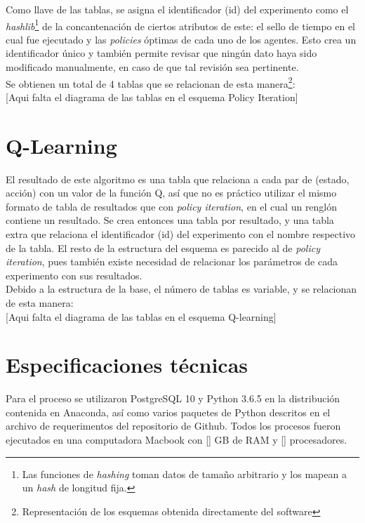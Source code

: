 Como llave de las tablas, se asigna el identificador (id) del experimento como el \textit{hashlib}\footnote{Las funciones de \textit{hashing} toman datos de tama\~no arbitrario y los mapean a un \textit{hash} de longitud fija.} de la concantenaci\'on de ciertos atributos de este: el sello de tiempo en el cual fue ejecutado y las \textit{policies} \'optimas de cada uno de los agentes. Esto crea un identificador \'unico y tambi\'en permite revisar que ning\'un dato haya sido modificado manualmente, en caso de que tal revisi\'on sea pertinente.\\

Se obtienen un total de 4 tablas que se relacionan de esta manera\footnote{Representaci\'on de los esquemas obtenida directamente del software }:\\

[Aqui falta el diagrama de las tablas en el esquema Policy Iteration]




\section{Q-Learning}

El resultado de este algoritmo es una tabla que relaciona a cada par de (estado, acci\'on) con un valor de la funci\'on Q, as\'i que no es pr\'actico utilizar el mismo formato de tabla de resultados que con \textit{policy iteration}, en el cual un rengl\'on contiene un resultado. Se crea entonces una tabla por resultado, y una tabla extra que relaciona el identificador (id) del experimento con el nombre respectivo de la tabla. El resto de la estructura del esquema es parecido al de \textit{policy iteration}, pues tambi\'en existe necesidad de relacionar los par\'ametros de cada experimento con sus resultados.\\

Debido a la estructura de la base, el n\'umero de tablas es variable, y se relacionan de esta manera:\\ 

[Aqui falta el diagrama de las tablas en el esquema Q-learning]

\section{Especificaciones t\'ecnicas}

Para el proceso se utilizaron PostgreSQL 10 y Python 3.6.5 en la distribuci\'on contenida en Anaconda, as\'i como varios paquetes de Python descritos en el archivo de requerimentos del repositorio de Github. Todos los procesos fueron ejecutados en una computadora Macbook con [] GB de RAM y [] procesadores.
